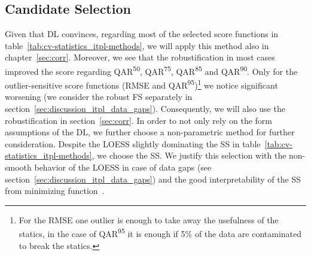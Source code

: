 {    \subsection{Candidate Selection}{\label{sec:itpl_candiate_selection}
        Given that DL convinces, regarding most of the selected score functions in table~\ref{tab:cv-statistics_itpl-methods}, we will apply this method also in chapter~\ref{sec:corr}. Moreover, we see that the robustification in most cases improved the score regarding QAR\textsuperscript{50}, QAR\textsuperscript{75}, QAR\textsuperscript{85} and QAR\textsuperscript{90}. Only for the outlier-sensitive score functions (RMSE and QAR\textsuperscript{95})\footnote{For the RMSE one outlier is enough to take away the usefulness of the statics, in the case of QAR\textsuperscript{95} it is enough if 5\% of the data are contaminated to break the statics.} we notice significant worsening (we consider the robust FS separately in section~\ref{sec:discussion_itpl_data_gaps}). Consequently, we will also use the robustification in section~\ref{sec:corr}.
        In order to not only rely on the form assumptions of the DL, we further choose a non-parametric method for further consideration. Despite the LOESS slightly dominating the SS in table~\ref{tab:cv-statistics_itpl-methods}, we choose the SS. We justify this selection with the non-smooth behavior of the LOESS in case of data gaps (see section~\ref{sec:discussion_itpl_data_gaps}) and the good interpretability of the SS from minimizing function~.
    }

}
